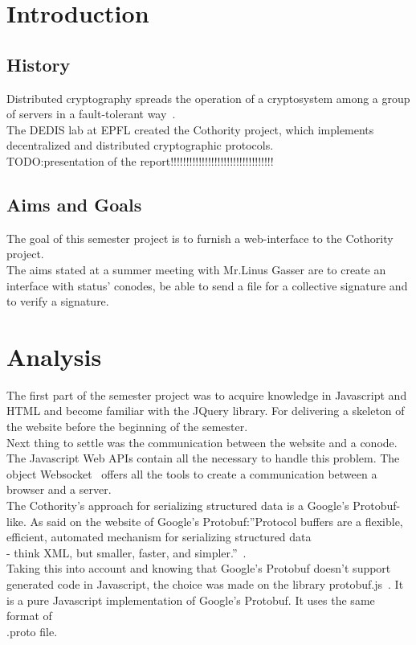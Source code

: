 \documentclass[11pt, a4paper, twoside, openright]{book} %
\begin{document}


\tableofcontents
\newpage

\chapter{Introduction}
\section{History}
Distributed cryptography spreads the operation of a cryptosystem among a group
of servers in a fault-tolerant way~\cite{definition}.\\
The DEDIS lab at EPFL created the Cothority project, which implements decentralized
and distributed cryptographic protocols.\\

TODO:presentation of the report!!!!!!!!!!!!!!!!!!!!!!!!!!!!!!!!!

\section{Aims and Goals}
The goal of this semester project is to furnish a web-interface to the Cothority
project.\\
The aims stated at a summer meeting with Mr.Linus Gasser are to create an
interface with status' conodes, be able to send a file for a collective signature
and to verify a signature.\\


\chapter{Analysis}
The first part of the semester project was to acquire knowledge in Javascript and
HTML and become familiar with the JQuery library. For delivering a skeleton of
the website before the beginning of the semester.\\
Next thing to settle was the communication between the website and a conode.
The Javascript Web APIs contain all the necessary to handle this problem.
The object Websocket~\cite{websocketPage} offers all the tools to create a
communication between a browser and a server.\\
The Cothority's approach for serializing structured data is a Google's Protobuf-like.
As said on the website of Google's Protobuf:''Protocol buffers are a flexible,
efficient, automated mechanism for serializing structured data \\- think XML, but
smaller, faster, and simpler.''~\cite{protobufDefi}.\\
Taking this into account and knowing that Google's Protobuf doesn't support generated
code in Javascript, the choice was made on the library protobuf.js~\cite{protobufjs}.
It is a pure Javascript implementation of Google's Protobuf. It uses the same format
of \\.proto file.
\end{document}
